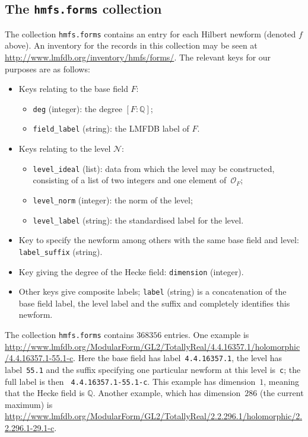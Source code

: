 \documentclass{llncs}
\def\Q{{\mathbb Q}}
\def\N{{\mathcal{N}}}
\def\O{{\mathcal{O}}}
\begin{document}
\subsection{The {\tt hmfs.forms} collection}
The collection {\tt hmfs.forms} contains an entry for each Hilbert
newform (denoted $f$ above).  An inventory for the records in this
collection may be seen at
\url{http://www.lmfdb.org/inventory/hmfs/forms/}.  The relevant keys
for our purposes are as follows:
\begin{itemize}
\item Keys relating to the base field $F$:
\begin{itemize}
\item {\tt deg} (integer): the degree $[F:\Q]$;
  \item {\tt field\_label} (string): the LMFDB label of $F$.
\end{itemize}
\item Keys relating to the level  $\N$:
\begin{itemize}
\item {\tt level\_ideal} (list): data from which the level may be
  constructed, consisting of a list of two integers and one element
  of~$\O_F$;
  \item {\tt level\_norm} (integer): the norm of the level;
\item {\tt level\_label} (string): the standardised label for the
  level.
\end{itemize}
\item Key to specify the newform among others with the same base field
  and level: {\tt label\_suffix} (string).
\item Key giving the degree of the Hecke field: {\tt dimension} (integer).
\item Other keys give composite labels; {\tt label} (string) is a
  concatenation of the base field label, the level label and the
  suffix and completely identifies this newform.
\end{itemize}

The collection {\tt hmfs.forms} contains $368356$ entries.  One
example is
\url{http://www.lmfdb.org/ModularForm/GL2/TotallyReal/4.4.16357.1/holomorphic/4.4.16357.1-55.1-c}.
Here the base field has label~{\tt 4.4.16357.1}, the level has
label~{\tt 55.1} and the suffix specifying one particular newform at
this level is~{\tt c}; the full label is then {\tt
  4.4.16357.1-55.1-c}.  This example has dimension~$1$, meaning that
the Hecke field is $\Q$.  Another example, which has dimension~$286$
(the current maximum) is
\url{http://www.lmfdb.org/ModularForm/GL2/TotallyReal/2.2.296.1/holomorphic/2.2.296.1-29.1-c}.
\end{document}
